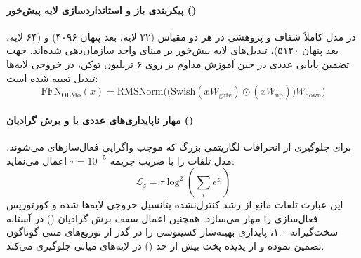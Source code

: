 \item {}

\paragraph*{پیکربندی باز و استانداردسازی لایه پیش‌خور ()}
در مدل کاملاً شفاف و پژوهشی  \cite{olmo2025olmo3} در هر دو مقیاس  (۳۲ لایه، بعد پنهان ۴۰۹۶) و  (۶۴ لایه، بعد پنهان ۵۱۲۰)، تبدیل‌های لایه پیش‌خور بر مبنای واحد  سازمان‌دهی شده‌اند. جهت تضمین پایایی عددی در حین آموزش مداوم بر روی ۶ تریلیون توکن، در خروجی لایه‌ها تبدیل  تعبیه شده است:
\begin{equation}
    \text{FFN}_{\text{OLMo}}(x) = \text{RMSNorm}\Big( \big(\text{Swish}(x W_{\text{gate}}) \odot (x W_{\text{up}})\big) W_{\text{down}} \Big)
\end{equation}

\paragraph*{مهار ناپایداری‌های عددی با  و برش گرادیان ()}
برای جلوگیری از انحرافات لگاریتمی بزرگ که موجب واگرایی فعال‌سازهای  می‌شوند، مدل  تلفات  را با ضریب جریمه $\tau = 10^{-5}$ اعمال می‌نماید:
\begin{equation}
    \mathcal{L}_z = \tau \log^2\left(\sum_{i} e^{z_i}\right)
\end{equation}
این عبارت تلفات مانع از رشد کنترل‌نشده پتانسیل خروجی لایه‌ها شده و کورتوزیس فعال‌سازی را مهار می‌سازد. همچنین اعمال سقف برش گرادیان () در آستانه سخت‌گیرانه ۱.۰، پایداری بهینه‌ساز کسینوسی را در گذر از توزیع‌های متنی گوناگون تضمین نموده و از پدیده پخت بیش از حد () در لایه‌های میانی جلوگیری می‌کند.


